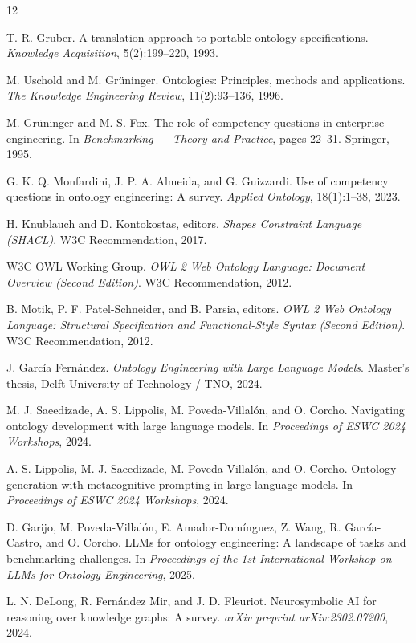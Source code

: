 \begin{thebibliography}{12}

T. R. Gruber.
A translation approach to portable ontology specifications.
\emph{Knowledge Acquisition}, 5(2):199--220, 1993.

M. Uschold and M. Gr\"{u}ninger.
Ontologies: Principles, methods and applications.
\emph{The Knowledge Engineering Review}, 11(2):93--136, 1996.

M. Gr\"{u}ninger and M. S. Fox.
The role of competency questions in enterprise engineering.
In \emph{Benchmarking --- Theory and Practice}, pages 22--31. Springer, 1995.

G. K. Q. Monfardini, J. P. A. Almeida, and G. Guizzardi.
Use of competency questions in ontology engineering: A survey.
\emph{Applied Ontology}, 18(1):1--38, 2023.

H. Knublauch and D. Kontokostas, editors.
\emph{Shapes Constraint Language (SHACL)}.
W3C Recommendation, 2017.

W3C OWL Working Group.
\emph{OWL 2 Web Ontology Language: Document Overview (Second Edition)}.
W3C Recommendation, 2012.

B. Motik, P. F. Patel-Schneider, and B. Parsia, editors.
\emph{OWL 2 Web Ontology Language: Structural Specification and Functional-Style Syntax (Second Edition)}.
W3C Recommendation, 2012.

J. Garc\'{i}a Fern\'{a}ndez.
\emph{Ontology Engineering with Large Language Models}.
Master's thesis, Delft University of Technology / TNO, 2024.

M. J. Saeedizade, A. S. Lippolis, M. Poveda-Villal\'{o}n, and O. Corcho.
Navigating ontology development with large language models.
In \emph{Proceedings of ESWC 2024 Workshops}, 2024.

A. S. Lippolis, M. J. Saeedizade, M. Poveda-Villal\'{o}n, and O. Corcho.
Ontology generation with metacognitive prompting in large language models.
In \emph{Proceedings of ESWC 2024 Workshops}, 2024.

D. Garijo, M. Poveda-Villal\'{o}n, E. Amador-Dom\'{i}nguez, Z. Wang, R. Garc\'{i}a-Castro, and O. Corcho.
LLMs for ontology engineering: A landscape of tasks and benchmarking challenges.
In \emph{Proceedings of the 1st International Workshop on LLMs for Ontology Engineering}, 2025.

L. N. DeLong, R. Fern\'{a}ndez Mir, and J. D. Fleuriot.
Neurosymbolic AI for reasoning over knowledge graphs: A survey.
\emph{arXiv preprint arXiv:2302.07200}, 2024.

\end{thebibliography}
